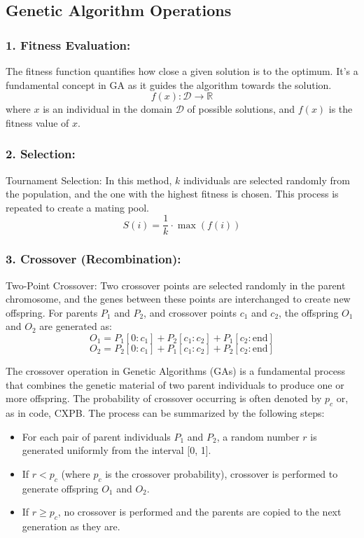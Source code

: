 \subsection{Genetic Algorithm Operations}

\subsubsection{1. Fitness Evaluation:}
The fitness function quantifies how close a given solution is to the optimum. It's a fundamental concept in GA as it guides the algorithm towards the solution.
\[
f(x) : \mathcal{D} \rightarrow \mathbb{R}
\]
where \( x \) is an individual in the domain \( \mathcal{D} \) of possible solutions, and \( f(x) \) is the fitness value of \( x \).

\subsubsection{2. Selection:}
Tournament Selection: In this method, \( k \) individuals are selected randomly from the population, and the one with the highest fitness is chosen. This process is repeated to create a mating pool.
\[
S(i) = \frac{1}{k} \cdot \max(f(i))
\]

\subsubsection{3. Crossover (Recombination):}
Two-Point Crossover: Two crossover points are selected randomly in the parent chromosome, and the genes between these points are interchanged to create new offspring.
For parents \( P_1 \) and \( P_2 \), and crossover points \( c_1 \) and \( c_2 \), the offspring \( O_1 \) and \( O_2 \) are generated as:
\[
O_1 = P_1[0:c_1] + P_2[c_1:c_2] + P_1[c_2:\text{end}]
\]
\[
O_2 = P_2[0:c_1] + P_1[c_1:c_2] + P_2[c_2:\text{end}]
\]

The crossover operation in Genetic Algorithms (GAs) is a fundamental process that combines the genetic material of two parent individuals to produce one or more offspring. The probability of crossover occurring is often denoted by  \( p_c \) or, as in code, CXPB. The process can be summarized by the following steps:

\begin{itemize}
    \item For each pair of parent individuals \( P_1 \) and \( P_2 \), a random number \( r \) is generated uniformly from the interval [0, 1].
    \item If \( r < p_c \) (where \( p_c \) is the crossover probability), crossover is performed to generate offspring \( O_1 \) and \( O_2 \).
    \item If \( r \geq p_c \), no crossover is performed and the parents are copied to the next generation as they are.
\end{itemize}


